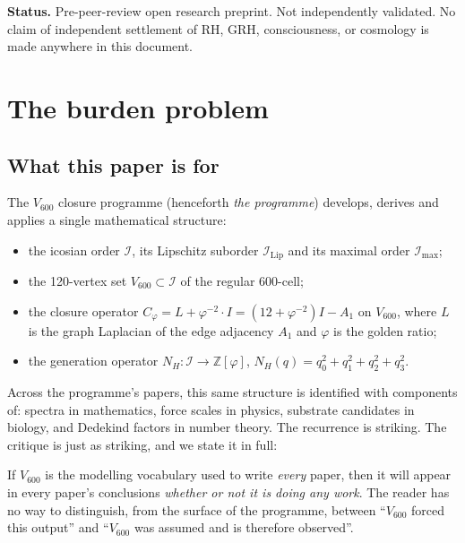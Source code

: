 \documentclass[11pt,a4paper]{article}
\newcommand{\II}{\mathcal{I}}
\newcommand{\IIlip}{\mathcal{I}_{\mathrm{Lip}}}
\newcommand{\IImax}{\mathcal{I}_{\max}}
\newcommand{\Vsix}{V_{600}}
\newcommand{\Cphi}{C_\varphi}
\newcommand{\NH}{N_H}
\newcommand{\Z}{\mathbb{Z}}
\begin{document}
\noindent\textbf{Status.} Pre-peer-review open research preprint.
Not independently validated. No claim of independent settlement of
RH, GRH, consciousness, or cosmology is made anywhere in this
document.

\bigskip

\tableofcontents

\newpage

\section{The burden problem}
\label{sec:burden}

\subsection{What this paper is for}

The $V_{600}$ closure programme (henceforth \emph{the programme})
develops, derives and applies a single mathematical structure:

\begin{itemize}[leftmargin=*]
  \item the icosian order $\II$, its Lipschitz suborder $\IIlip$ and
        its maximal order $\IImax$;
  \item the 120-vertex set $\Vsix \subset \II$ of the regular
        $600$-cell;
  \item the closure operator
        $\Cphi = L + \varphi^{-2}\!\cdot\! I = (12+\varphi^{-2})I - A_1$
        on $\Vsix$, where $L$ is the graph Laplacian of the edge
        adjacency $A_1$ and $\varphi$ is the golden ratio;
  \item the generation operator $\NH : \II \to \Z[\varphi]$,
        $\NH(q) = q_0^2 + q_1^2 + q_2^2 + q_3^2$.
\end{itemize}

Across the programme's papers, this same structure is identified
with components of: spectra in mathematics, force scales in physics,
substrate candidates in biology, and Dedekind factors in number
theory. The recurrence is striking. The critique is just as
striking, and we state it in full:

\begin{burdenbox}
If $\Vsix$ is the modelling vocabulary used to write \emph{every}
paper, then it will appear in every paper's conclusions
\emph{whether or not it is doing any work}. The reader has no way
to distinguish, from the surface of the programme, between
``$\Vsix$ forced this output'' and ``$\Vsix$ was assumed and is
therefore observed''.
\end{burdenbox}
\end{document}
